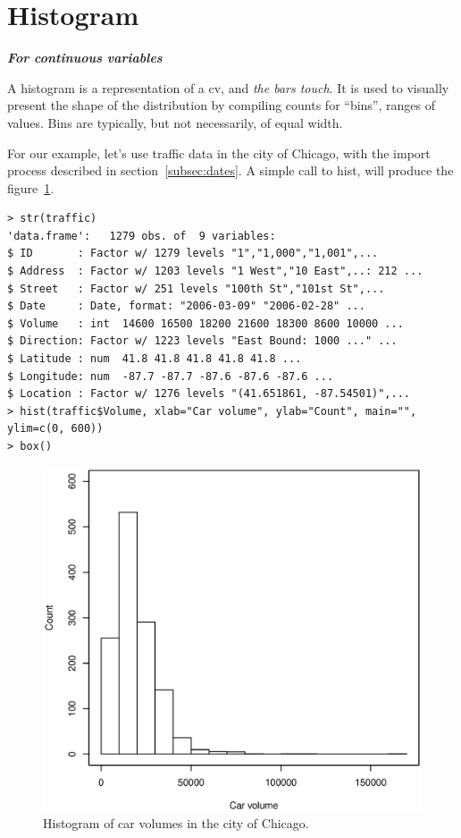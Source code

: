 \documentclass{report}
\newcommand{\code}[1]{\textsf{\ttfamily #1}}
\newcommand{\notefor}[1]{\hfill\textbf{\textit{#1}}}
\begin{document}
	\section{Histogram}
	\notefor{For continuous variables}
	
	A histogram is a representation of a \gls{cv}, and \emph{the bars touch}. It is used to visually present the shape of the distribution by compiling counts for ``bins'', ranges of values. Bins are typically, but not necessarily, of equal width.
	
	For our example, let's use traffic data in the city of Chicago, with the import process described in section~\ref{subsec:dates}. A simple call to \code{hist}, will produce the figure~\ref{fig:hist}.
	
	\begin{verbatim}
> str(traffic)
'data.frame':   1279 obs. of  9 variables:
$ ID       : Factor w/ 1279 levels "1","1,000","1,001",...
$ Address  : Factor w/ 1203 levels "1 West","10 East",..: 212 ...
$ Street   : Factor w/ 251 levels "100th St","101st St",...
$ Date     : Date, format: "2006-03-09" "2006-02-28" ...
$ Volume   : int  14600 16500 18200 21600 18300 8600 10000 ...
$ Direction: Factor w/ 1223 levels "East Bound: 1000 ..." ...
$ Latitude : num  41.8 41.8 41.8 41.8 41.8 ...
$ Longitude: num  -87.7 -87.7 -87.6 -87.6 -87.6 ...
$ Location : Factor w/ 1276 levels "(41.651861, -87.54501)",...
> hist(traffic$Volume, xlab="Car volume", ylab="Count", main="", ylim=c(0, 600))
> box()
	\end{verbatim}
	\begin{figure}[h]
		\centering
		\includegraphics[width=1.0\textwidth]{hist.eps}
		\caption{Histogram of car volumes in the city of Chicago.}
		\label{fig:hist}
	\end{figure}
	
\end{document}
